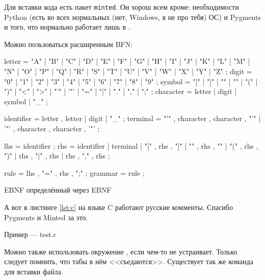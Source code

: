 \else

Для вставки кода есть пакет \texttt{minted}. Он хорош всем кроме: необходимости Python (есть во всех нормальных (нет, Windows, я не про тебя) ОС) и Pygments и того, что нормально работает лишь в \XeLaTeX.

Можно пользоваться расширенным BFN:

\begin{listing}[H]
    \begin{ebnfcode}
        letter = "A" | "B" | "C" | "D" | "E" | "F" | "G"
        | "H" | "I" | "J" | "K" | "L" | "M" | "N"
        | "O" | "P" | "Q" | "R" | "S" | "T" | "U"
        | "V" | "W" | "X" | "Y" | "Z" ;
        digit = "0" | "1" | "2" | "3" | "4" | "5" | "6" | "7" | "8" | "9" ;
        symbol = "[" | "]" | "{" | "}" | "(" | ")" | "<" | ">"
        | "'" | '"' | "=" | "|" | "." | "," | ";" ;
        character = letter | digit | symbol | "_" ;

        identifier = letter , { letter | digit | "_" } ;
        terminal = "'" , character , { character } , "'"
        | '"' , character , { character } , '"' ;

        lhs = identifier ;
        rhs = identifier
        | terminal
        | "[" , rhs , "]"
        | "{" , rhs , "}"
        | "(" , rhs , ")"
        | rhs , "|" , rhs
        | rhs , "," , rhs ;

        rule = lhs , "=" , rhs , ";" ;
        grammar = { rule } ;
    \end{ebnfcode}
    \caption{EBNF определённый через EBNF}
    \label{lst:ebnf}
\end{listing}

А вот в листинге \ref{lst:c} на языке C работают русские комменты. Спасибо Pygments и Minted за это.

\begin{listing}[H]
    \caption{Пример — test.c}
\end{listing}
\label{lst:c}

\fi





Можно также использовать окружение , если  чем-то не
устраивает. Только следует помнить, что табы в нём <<съедаются>>. Существует так же команда  для вставки файла.

